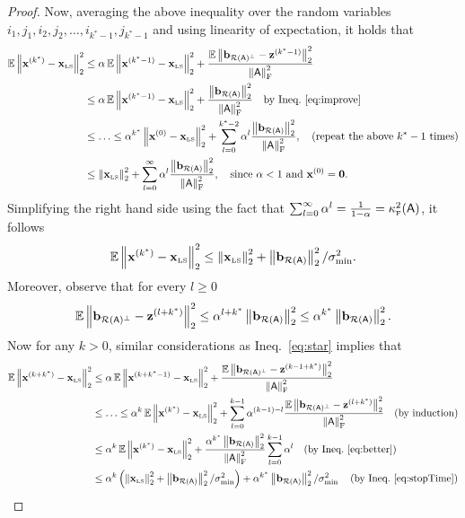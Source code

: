 \begin{proof}
%
Now, averaging the above inequality over the random variables $i_1,j_1, i_2, j_2, \ldots, i_{k^* - 1}, j_{k^* - 1}$ and using linearity of expectation, it holds that
\begin{align}
	\operatorname{\mathbb{E}} \left\|\mathbf{x}^{(k^*)} - \mathbf{x}_{\textrm{\tiny LS}}\right\|_2^2 & \leq  \alpha  \operatorname{\mathbb{E}}\left\|\mathbf{x}^{(k^* - 1)} - \mathbf{x}_{\textrm{\tiny LS}}\right\|_2^2 + \frac{ \operatorname{\mathbb{E}}\left\|{{\mathbf b}_{\mathcal{R}({\mathsf{A} })^\bot } } - \mathbf{z}^{(k^* - 1)}\right\|_2^2}{\left\|{\mathsf{A} }\right\|_{\textrm{F}}^2}\label{eq:star}\\
	& \leq  \alpha \operatorname{\mathbb{E}} \left\|\mathbf{x}^{(k^* - 1)} - \mathbf{x}_{\textrm{\tiny LS}}\right\|_2^2 + \frac{\left\|{{\mathbf b}_{\mathcal{R}({\mathsf{A} }) } }\right\|_2^2}{\left\|{\mathsf{A} }\right\|_{\textrm{F}}^2} \quad  \text{by Ineq.}~\eqref{eq:improve}\nonumber\\
	& \leq  \ldots \leq \alpha^{k^*}\left\|\mathbf{x}^{(0)} - \mathbf{x}_{\textrm{\tiny LS}}\right\|_2^2 + \sum_{l=0}^{k^* - 2} \alpha^l \frac{\left\|{{\mathbf b}_{\mathcal{R}({\mathsf{A} }) } }\right\|_2^2}{\left\|{\mathsf{A} }\right\|_{\textrm{F}}^2},\quad (\text{repeat the above } k^* - 1 \text{ times}) \nonumber \\
	& \leq  \left\|\mathbf{x}_{\textrm{\tiny LS}}\right\|_2^2 + \sum_{l=0}^{\infty} \alpha^l \frac{\left\|{{\mathbf b}_{\mathcal{R}({\mathsf{A} }) } }\right\|_2^2}{\left\|{\mathsf{A} }\right\|_{\textrm{F}}^2}, \quad \text{since } \alpha <1\text{ and }\mathbf{x}^{(0)} = \mathbf{0} . \nonumber
\end{align}
Simplifying the right hand side using the fact that $\sum_{l=0}^{\infty} \alpha^l = \frac1{1-\alpha} = \kappa^2_{\textrm{\tiny F}}({\mathsf{A} })$, it follows
\begin{equation}\label{eq:stopTime}
		\operatorname{\mathbb{E}} \left\|\mathbf{x}^{(k^*)} - \mathbf{x}_{\textrm{\tiny LS}}\right\|_2^2 \leq  \left\|\mathbf{x}_{\textrm{\tiny LS}}\right\|_2^2 + \left\|{{\mathbf b}_{\mathcal{R}({\mathsf{A} }) } }\right\|_2^2/\sigma_{\min}^2.
\end{equation}
Moreover, observe that for every $l\geq 0$
\begin{equation}\label{eq:better}
\operatorname{\mathbb{E}} \left\|{{\mathbf b}_{\mathcal{R}({\mathsf{A} })^\bot } } - \mathbf{z}^{(l+k^*)}\right\|_2^2 \leq \alpha^{l+k^*} \left\|{{\mathbf b}_{\mathcal{R}({\mathsf{A} }) } }\right\|_2^2 \leq \alpha^{k^*}\left\|{{\mathbf b}_{\mathcal{R}({\mathsf{A} }) } }\right\|_2^2.
\end{equation}
Now for any $k>0$, similar considerations as Ineq.~\eqref{eq:star} implies that
\begin{align*}
\EE \norm{\x^{(k + k^*)} - \xls}^2  & \leq   \alpha \EE \norm{\x^{(k + k^* - 1)} - \xls}^2 + \frac{\EE \norm{\bc - \z^{(k - 1 + k^*)}}^2}{\frobnorm{\matA}^2} \\
									& \leq   \ldots \leq \alpha^k \EE \norm{\x^{(k^*)} - \xls}^2 + \sum_{l=0}^{k - 1}\alpha^{(k - 1) - l} \frac{\EE \norm{\bc - \z^{(l + k^*)}}^2}{\frobnorm{\matA}^2} \quad \text{(by induction)}\\
									& \leq   \alpha^k \EE \norm{\x^{(k^*)} - \xls}^2 + \frac{\alpha^{k^*}\norm{\br}^2}{\frobnorm{\matA}^2} \sum_{l=0}^{k - 1}\alpha^{l} \quad  \text{(by Ineq.~\eqref{eq:better})} \\
									& \leq   \alpha^k \left(\norm{\xls}^2 + \norm{\br}^2/\sigma_{\min}^2\right)  + \alpha^{k^*}\norm{\br}^2 / \sigma_{\min}^2 \quad  \left(\text{by Ineq.~\eqref{eq:stopTime}}\right) \\

\end{align*}
\end{proof}

